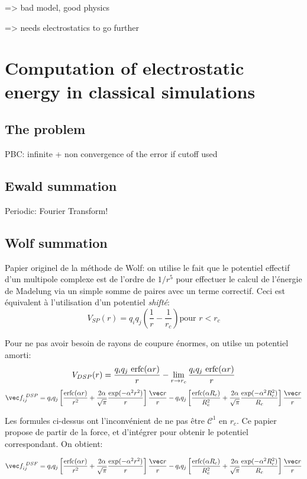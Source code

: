 \documentclass[thesis]{subfiles}
\begin{document}
=> bad model, good physics

=> needs electrostatics to go further

\newpage
\section{Computation of electrostatic energy in classical simulations}
\label{sec:electrostatic}

\subsection{The problem}

PBC: infinite + non convergence of the error if cutoff used

\subsection{Ewald summation}

Periodic: Fourier Transform!

\subsection{Wolf summation}

Papier originel de la méthode de Wolf\cite{Wolf1999}: on utilise le fait que le
potentiel effectif d'un multipole complexe est de l'ordre de $1/r^5$ pour
effectuer le calcul de l'énergie de Madelung via un simple somme de paires avec
un terme correctif. Ceci est équivalent à l'utilisation d'un potentiel
\emph{shifté}:
\[V_{SP}(r) = q_i q_j \left(\frac{1}{r} - \frac{1}{r_c} \right) \text{pour } r < r_c\]

Pour ne pas avoir besoin de rayons de coupure énormes, on utilse un potentiel amorti:
\[V_{DSP}(r) = \frac{q_i q_j \ \erfc(\alpha r)}{r} - \lim_{r \to r_c} \frac{q_i q_j \ \erfc(\alpha r)}{r}\]
\[\vec f_{ij}^{\ DSP} = q_i q_j \left[\frac{\erfc(\alpha r)}{r^2} + \frac{2\alpha}{\sqrt{\pi}} \frac{\exp(-\alpha^2 r^2)}{r}\right] \frac{\vec r}{r}
- q_i q_j \left[\frac{\erfc(\alpha R_c)}{R_c^2} + \frac{2\alpha}{\sqrt{\pi}} \frac{\exp(-\alpha^2 R_c^2)}{R_c}\right] \frac{\vec r}{r}\]


Les formules ci-dessus ont l'inconvénient de ne pas être $\mathcal{C}^1$ en $r_c$. Ce
papier\cite{Fennell2006} propose de partir de la force, et d'intégrer pour obtenir le potentiel
correspondant. On obtient:

\[\vec f_{ij}^{\ DSF} = q_i q_j \left[\frac{\erfc(\alpha r)}{r^2} + \frac{2\alpha}{\sqrt{\pi}} \frac{\exp(-\alpha^2 r^2)}{r}\right] \frac{\vec r}{r}
- q_i q_j \left[\frac{\erfc(\alpha R_c)}{R_c^2} + \frac{2\alpha}{\sqrt{\pi}} \frac{\exp(-\alpha^2 R_c^2)}{R_c}\right] \frac{\vec r}{r}\]
\end{document}
